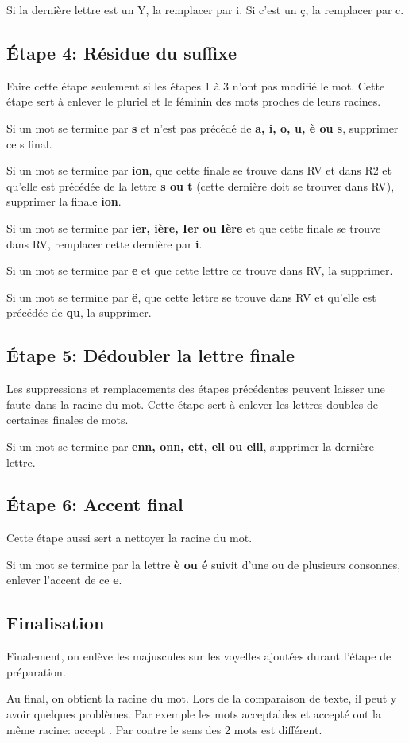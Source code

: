 Si la dernière lettre est un Y, la remplacer par i.
Si c'est un ç, la remplacer par c.

\subsection*{Étape 4: Résidue du suffixe}

Faire cette étape seulement si les étapes 1 à 3 n'ont pas modifié le mot.
Cette étape sert à enlever le pluriel et le féminin des mots proches de leurs racines.

Si un mot se termine par \textbf{s} et n'est pas précédé de \textbf{a, i, o, u, è ou s}, supprimer ce s final.

Si un mot se termine par \textbf{ion}, que cette finale se trouve dans RV et dans R2 et qu'elle est précédée de la lettre \textbf{s ou t} (cette dernière doit se trouver dans RV), supprimer la finale \textbf{ion}.

Si un mot se termine par \textbf{ier, ière, Ier ou Ière} et que cette finale se trouve dans RV, remplacer cette dernière par \textbf{i}.

Si un mot se termine par \textbf{e} et que cette lettre ce trouve dans RV, la supprimer.

Si un mot se termine par \textbf{ë}, que cette lettre se trouve dans RV et qu'elle est précédée de \textbf{qu}, la supprimer.

\subsection*{Étape 5: Dédoubler la lettre finale}

Les suppressions et remplacements des étapes précédentes peuvent laisser une faute dans la racine du mot.
Cette étape sert à enlever les lettres doubles de certaines finales de mots.

Si un mot se termine par \textbf{enn, onn, ett, ell ou eill}, supprimer la dernière lettre.

\subsection*{Étape 6: Accent final}

Cette étape aussi sert a nettoyer la racine du mot.

Si un mot se termine par la lettre \textbf{è ou é} suivit d'une ou de plusieurs consonnes, enlever l'accent de ce \textbf{e}.

\subsection*{Finalisation}

Finalement, on enlève les majuscules sur les voyelles ajoutées durant l'étape de préparation.

Au final, on obtient la racine du mot.
Lors de la comparaison de texte, il peut y avoir quelques problèmes.
Par exemple les mots \og acceptables \fg{} et \og accepté \fg{} ont la même racine: \og accept \fg{}.
Par contre le sens des 2 mots est différent.